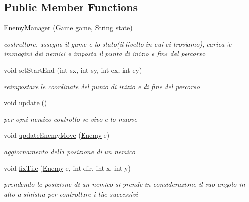 \subsection*{Public Member Functions}
\begin{DoxyCompactItemize}
\item 
\hyperlink{classmanagers_1_1_enemy_manager_ab48b3c6b84a71fc0278ad44f818701c6}{Enemy\+Manager} (\hyperlink{classprogetto_1_1_game}{Game} \hyperlink{classmanagers_1_1_enemy_manager_ac6a5ed6191fcf3a5bf0445921feb4f48}{game}, String \hyperlink{classmanagers_1_1_enemy_manager_a91ac952876f776b3fbbc8519e093fdbf}{state})
\begin{DoxyCompactList}\small\item\em costruttore. assegna il game e lo stato(il livello in cui ci troviamo), carica le immagini dei nemici e imposta il punto di inizio e fine del percorso \end{DoxyCompactList}\item 
void \hyperlink{classmanagers_1_1_enemy_manager_aa38fcad82cf2cd5ac5531d8c2004fdda}{set\+Start\+End} (int sx, int sy, int ex, int ey)
\begin{DoxyCompactList}\small\item\em reimpostare le coordinate del punto di inizio e di fine del percorso \end{DoxyCompactList}\item 
void \hyperlink{classmanagers_1_1_enemy_manager_ac5c54df7ed3b930268c8d7752c101725}{update} ()
\begin{DoxyCompactList}\small\item\em per ogni nemico controllo se vivo e lo muove \end{DoxyCompactList}\item 
void \hyperlink{classmanagers_1_1_enemy_manager_a8f172cfa5ade4d4f0a6b89cc6bfc4d12}{update\+Enemy\+Move} (\hyperlink{classenemies_1_1_enemy}{Enemy} e)
\begin{DoxyCompactList}\small\item\em aggiornamento della posizione di un nemico \end{DoxyCompactList}\item 
void \hyperlink{classmanagers_1_1_enemy_manager_a01056d4d58ff52ab419ad8924922132d}{fix\+Tile} (\hyperlink{classenemies_1_1_enemy}{Enemy} e, int dir, int x, int y)
\begin{DoxyCompactList}\small\item\em prendendo la posizione di un nemico si prende in considerazione il suo angolo in alto a sinistra per controllare i tile successivi \end{DoxyCompactList}\item 

\end{DoxyCompactItemize}
